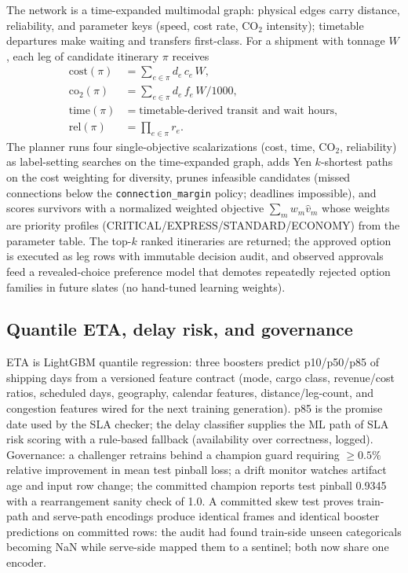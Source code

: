 \documentclass[11pt]{article}
\begin{document}
The network is a time-expanded multimodal graph: physical edges carry
distance, reliability, and parameter keys (speed, cost rate, CO$_2$
intensity); timetable departures make waiting and transfers first-class.
For a shipment with tonnage $W$, each leg of candidate itinerary $\pi$
receives
\begin{align}
\mathrm{cost}(\pi) &= \sum_{e \in \pi} d_e \, c_e \, W,\\
\mathrm{co}_2(\pi) &= \sum_{e \in \pi} d_e \, f_e \, W / 1000,\\
\mathrm{time}(\pi) &= \text{timetable-derived transit and wait hours},\\
\mathrm{rel}(\pi) &= \prod_{e \in \pi} r_e .
\end{align}
The planner runs four single-objective scalarizations (cost, time,
CO$_2$, reliability) as label-setting searches on the time-expanded
graph, adds Yen $k$-shortest paths on the cost weighting for diversity,
prunes infeasible candidates (missed connections below the
\texttt{connection\_margin} policy; deadlines impossible), and scores
survivors with a normalized weighted objective
$\sum_m w_m \hat{v}_m$ whose weights are priority profiles
(CRITICAL/EXPRESS/STANDARD/ECONOMY) from the parameter table. The top-$k$
ranked itineraries are returned; the approved option is executed as leg
rows with immutable decision audit, and observed approvals feed a
revealed-choice preference model that demotes repeatedly rejected option
families in future slates (no hand-tuned learning weights).

\subsection{Quantile ETA, delay risk, and governance}

ETA is LightGBM quantile regression: three boosters predict
p10/p50/p85 of shipping days from a versioned feature contract
(mode, cargo class, revenue/cost ratios, scheduled days, geography,
calendar features, distance/leg-count, and congestion features wired for
the next training generation). p85 is the promise date used by the SLA
checker; the delay classifier supplies the ML path of SLA risk scoring
with a rule-based fallback (availability over correctness, logged).
Governance: a challenger retrains behind a champion guard requiring
$\ge 0.5\%$ relative improvement in mean test pinball loss; a drift
monitor watches artifact age and input row change; the committed champion
reports test pinball 0.9345 with a rearrangement sanity check of 1.0.
A committed skew test proves train-path and serve-path encodings produce
identical frames and identical booster predictions on committed rows:
the audit had found train-side unseen categoricals becoming NaN while
serve-side mapped them to a sentinel; both now share one encoder.
\end{document}

